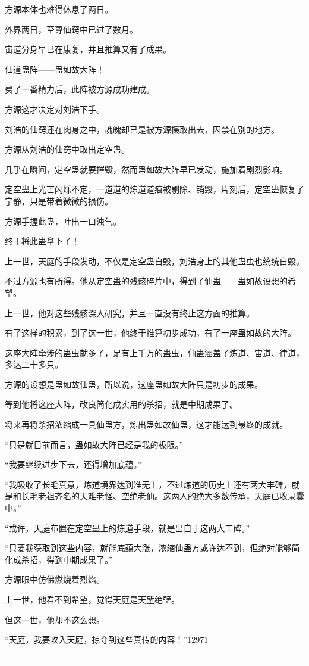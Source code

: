 \begin{this_body}
方源本体也难得休息了两日。

外界两日，至尊仙窍中已过了数月。

宙道分身早已在康复，并且推算又有了成果。

仙道蛊阵——蛊如故大阵！

费了一番精力后，此阵被方源成功建成。

方源这才决定对刘浩下手。

刘浩的仙窍还在肉身之中，魂魄却已是被方源摄取出去，囚禁在别的地方。

方源从刘浩的仙窍中取出定空蛊。

几乎在瞬间，定空蛊就要摧毁，然而蛊如故大阵早已发动，施加着剧烈影响。

定空蛊上光芒闪烁不定，一道道的炼道道痕被剔除、销毁，片刻后，定空蛊恢复了宁静，只是带着微微的损伤。

方源手握此蛊，吐出一口浊气。

终于将此蛊拿下了！

上一世，天庭的手段发动，不仅是定空蛊自毁，刘浩身上的其他蛊虫也统统自毁。

不过方源也有所得。他从定空蛊的残骸碎片中，得到了仙蛊——蛊如故设想的希望。

上一世，他对这些残骸深入研究，并且一直没有终止这方面的推算。

有了这样的积累，到了这一世，他终于推算初步成功，有了一座蛊如故的大阵。

这座大阵牵涉的蛊虫就多了，足有上千万的蛊虫，仙蛊涵盖了炼道、宙道、律道，多达二十多只。

方源的设想是蛊如故仙蛊，所以说，这座蛊如故大阵只是初步的成果。

等到他将这座大阵，改良简化成实用的杀招，就是中期成果了。

将来再将杀招浓缩成一具仙蛊方，炼出蛊如故仙蛊，这才能达到最终的成就。

“只是就目前而言，蛊如故大阵已经是我的极限。”

“我要继续进步下去，还得增加底蕴。”

“我吸收了长毛真意，炼道境界达到准无上，不过炼道的历史上还有两大丰碑，就是和长毛老祖齐名的天难老怪、空绝老仙。这两人的绝大多数传承，天庭已收录囊中。”

“或许，天庭布置在定空蛊上的炼道手段，就是出自于这两大丰碑。”

“只要我获取到这些内容，就能底蕴大涨，浓缩仙蛊方或许达不到，但绝对能够简化成杀招，得到中期成果了。”

方源眼中仿佛燃烧着烈焰。

上一世，他看不到希望，觉得天庭是天堑绝壁。

但这一世，他却不这么想。

“天庭，我要攻入天庭，掠夺到这些真传的内容！”12971

------------

\end{this_body}


